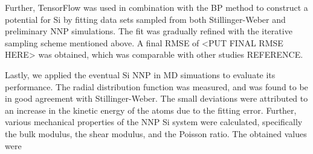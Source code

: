 \documentclass[twoside,english]{uiofysmaster}
\begin{document}
Further, TensorFlow was used in combination with the BP method to construct a potential for Si by 
fitting data sets sampled from both Stillinger-Weber and preliminary NNP simulations. The fit was gradually refined 
with the iterative sampling scheme mentioned above. A final RMSE of <PUT FINAL RMSE HERE> was obtained, 
which was comparable with other studies REFERENCE. 

Lastly, we applied the eventual Si NNP in MD simuations to evaluate its performance. 
The radial distribution function was measured, and was found to be in good agreement with Stillinger-Weber. 
The small deviations were attributed to an increase in the kinetic energy of the atoms due to the fitting error.
Further, various mechanical properties of the NNP Si system were calculated, specifically the bulk modulus, the shear 
modulus, and the Poisson ratio. The obtained values were
\end{document}
